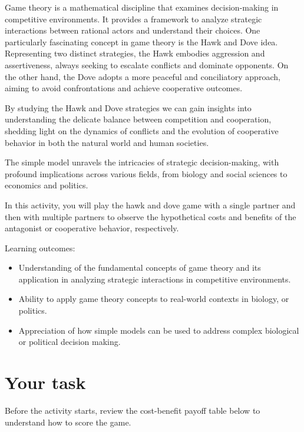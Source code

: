 \documentclass[
  a4paper]{book}
\providecommand{\tightlist}{%
  \setlength{\itemsep}{0pt}\setlength{\parskip}{0pt}}
\begin{document}
Game theory is a mathematical discipline that examines decision-making in competitive environments. It provides a framework to analyze strategic interactions between rational actors and understand their choices. One particularly fascinating concept in game theory is the Hawk and Dove idea. Representing two distinct strategies, the Hawk embodies aggression and assertiveness, always seeking to escalate conflicts and dominate opponents. On the other hand, the Dove adopts a more peaceful and conciliatory approach, aiming to avoid confrontations and achieve cooperative outcomes.

By studying the Hawk and Dove strategies we can gain insights into understanding the delicate balance between competition and cooperation, shedding light on the dynamics of conflicts and the evolution of cooperative behavior in both the natural world and human societies.

The simple model unravels the intricacies of strategic decision-making, with profound implications across various fields, from biology and social sciences to economics and politics.

In this activity, you will play the hawk and dove game with a single partner and then with multiple partners to observe the hypothetical costs and benefits of the antagonist or cooperative behavior, respectively.

\begin{do-something}
Learning outcomes:

\begin{itemize}
\tightlist
\item
  Understanding of the fundamental concepts of game theory and its
  application in analyzing strategic interactions in competitive
  environments.
\item
  Ability to apply game theory concepts to real-world contexts in
  biology, or politics.
\item
  Appreciation of how simple models can be used to address complex
  biological or political decision making.
\end{itemize}
\end{do-something}

\section{Your task}\label{your-task-17}

Before the activity starts, review the cost-benefit payoff table below to understand how to score the game.
\end{document}
